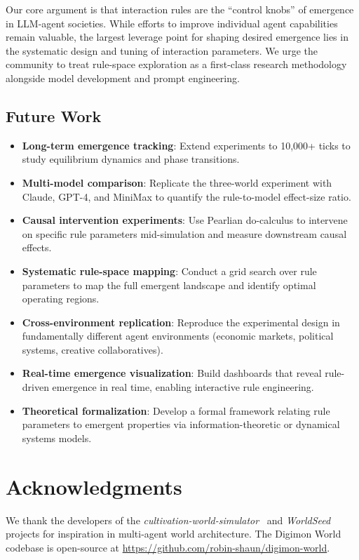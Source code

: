 \documentclass[11pt]{article}
\begin{document}
Our core argument is that interaction rules are the ``control knobs'' of emergence in LLM-agent societies.
While efforts to improve individual agent capabilities remain valuable, the largest leverage point for shaping desired emergence lies in the systematic design and tuning of interaction parameters.
We urge the community to treat rule-space exploration as a first-class research methodology alongside model development and prompt engineering.

\subsection{Future Work}

\begin{itemize}[leftmargin=*,nosep]
    \item \textbf{Long-term emergence tracking}: Extend experiments to 10{,}000+ ticks to study equilibrium dynamics and phase transitions.
    \item \textbf{Multi-model comparison}: Replicate the three-world experiment with Claude, GPT-4, and MiniMax to quantify the rule-to-model effect-size ratio.
    \item \textbf{Causal intervention experiments}: Use Pearlian do-calculus to intervene on specific rule parameters mid-simulation and measure downstream causal effects.
    \item \textbf{Systematic rule-space mapping}: Conduct a grid search over rule parameters to map the full emergent landscape and identify optimal operating regions.
    \item \textbf{Cross-environment replication}: Reproduce the experimental design in fundamentally different agent environments (economic markets, political systems, creative collaboratives).
    \item \textbf{Real-time emergence visualization}: Build dashboards that reveal rule-driven emergence in real time, enabling interactive rule engineering.
    \item \textbf{Theoretical formalization}: Develop a formal framework relating rule parameters to emergent properties via information-theoretic or dynamical systems models.
\end{itemize}

\section*{Acknowledgments}
We thank the developers of the \emph{cultivation-world-simulator}~\cite{cultivation2026world} and \emph{WorldSeed}~\cite{worldseed2026} projects for inspiration in multi-agent world architecture.
The Digimon World codebase is open-source at \url{https://github.com/robin-shaun/digimon-world}.
\end{document}
